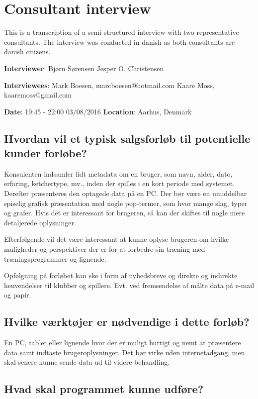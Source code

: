 \chapter{Consultant interview}
This is a transcription of a semi structured interview with two representative consultants.
The interview was conducted in danish as both consultants are danish citizens.

\textbf{Interviewer}: \newline
Bjørn Sørensen \newline
Jesper O. Christensen

\textbf{Interviewees}: \newline 
Mark Boesen, marcboesen@hotmail.com \newline
Kaare Moss, kaaremoss@gmail.com

\textbf{Date}: 19:45 - 22:00 03/08/2016 \newline
\textbf{Location}: Aarhus, Denmark

\section*{Hvordan vil et typisk salgsforløb til potentielle kunder forløbe?}
Konsulenten indsamler lidt metadata om en bruger, som navn, alder, dato, erfaring, ketchertype, mv., inden der spilles i en kort periode med systemet. 
Derefter præsenteres den optagede data på en PC. 
Der bør være en umiddelbar spiselig grafisk præsentation med nogle pop-termer, som hvor mange slag, typer og grafer.
Hvis det er interessant for brugeren, så kan der skiftes til nogle mere detaljerede oplysninger.

Efterfølgende vil det være interessant at kunne oplyse brugeren om hvilke muligheder og perspektiver der er for at forbedre sin træning med træningsprogrammer og lignende.

Opfølgning på forløbet kan ske i form af nyhedsbreve og direkte og indirekte henvendelser til klubber og spillere.
Evt. ved fremsendelse af målte data på e-mail og papir.

\section*{Hvilke værktøjer er nødvendige i dette forløb?}
En PC, tablet eller lignende hvor der er muligt hurtigt og nemt at præsentere data samt indtaste brugeroplysninger.
Det bør virke uden internetadgang, men skal senere kunne sende data ud til videre behandling.

\section*{Hvad skal programmet kunne udføre?}

